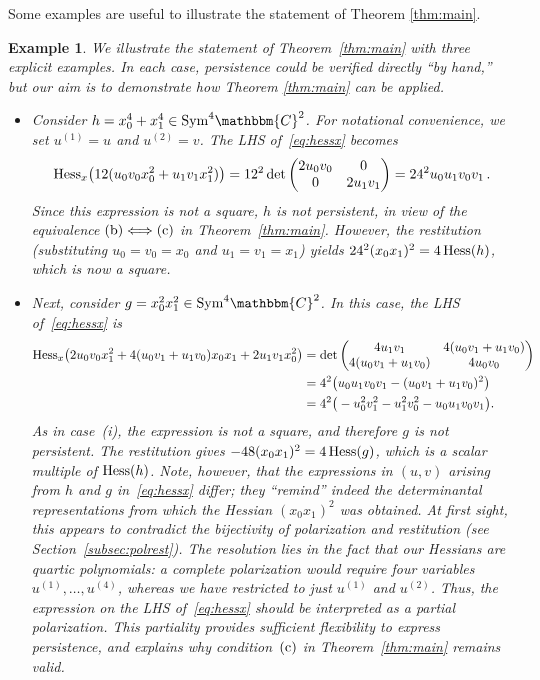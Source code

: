 \documentclass[aps,floatfix,groupedaddress,superscriptaddress,longbibliography,footinbib,notitlepage,showpacs]{revtex4-1}
\def\Hess{{\rm Hess}}
\newtheorem{example}[theorem]{Example}
\begin{document}
Some examples are useful to illustrate the statement of Theorem \ref{thm:main}.

\begin{example}\label{exa:hessbinary}
We illustrate the statement of Theorem~\ref{thm:main} with three explicit examples. In each case, persistence could be verified directly ``by hand,'' but our aim is to demonstrate 
how Theorem \ref{thm:main} can be applied.
\begin{itemize}
\item[(i)]
Consider $h=x_0^4+x_1^4\in\mathrm{Sym}^4\mathbbm{C}^2$. For notational convenience, we set $u^{(1)} = u$ and $u^{(2)} = v$. 
The LHS of~\eqref{eq:hessx} becomes
\[
\Hess_x\big(12(u_0v_0x_0^2+u_1v_1x_1^2)\big)=12^2\det\begin{pmatrix}2u_0v_0&0\\0&2u_1v_1\end{pmatrix}=24^2u_0u_1v_0v_1\,.
\]
Since this expression is not a square, $h$ is not persistent, 
in view of the equivalence $(\textnormal{b}) \Longleftrightarrow (\textnormal{c})$ in Theorem~\ref{thm:main}. However, the restitution (substituting $u_0=v_0=x_0$ and $u_1=v_1=x_1$) yields $24^2(x_0x_1)^2=4\,\Hess(h)$, which is now a square.

\item[(ii)] Next, consider $g=x_0^2x_1^2\in\mathrm{Sym}^4\mathbbm{C}^2$. In this case, the LHS of~\eqref{eq:hessx} is
\begin{align*}
\Hess_x\big(2u_0v_0x_1^2+4(u_0v_1+u_1v_0)x_0x_1+2u_1v_1x_0^2\big)&=\det\begin{pmatrix}4u_1v_1&4(u_0v_1+u_1v_0)\\
4(u_0v_1+u_1v_0)&4u_0v_0\end{pmatrix} \\
&=4^2\big(u_0u_1v_0v_1-(u_0v_1+u_1v_0)^2\big) \\
&=4^2\big(-u_0^2v_1^2-u_1^2v_0^2-u_0u_1v_0v_1\big).
\end{align*}
As in case~(i), the expression is not a square, and therefore $g$ is not persistent. The restitution gives $-48(x_0x_1)^2=4\,\Hess(g)$, which is a scalar multiple of $\Hess(h)$. Note, however, that the expressions in $(u,v)$ arising from $h$ and $g$ in~\eqref{eq:hessx} differ; they ``remind'' indeed the determinantal representations 
from which the Hessian $(x_0 x_1)^2$ was obtained. At first sight, this appears to contradict the bijectivity of polarization and restitution (see Section~\ref{subsec:polrest}). The resolution lies in the fact that our Hessians are quartic polynomials: a complete polarization would require four variables $u^{(1)}, \ldots, u^{(4)}$, whereas we have restricted to just $u^{(1)}$ and $u^{(2)}$. Thus, the expression on the LHS of~\eqref{eq:hessx} 
should be interpreted as a partial polarization. This partiality provides sufficient flexibility to express persistence, and explains why condition~$(\textnormal{c})$ in Theorem~\ref{thm:main} remains valid.


\end{itemize}
\end{example}
\end{document}
